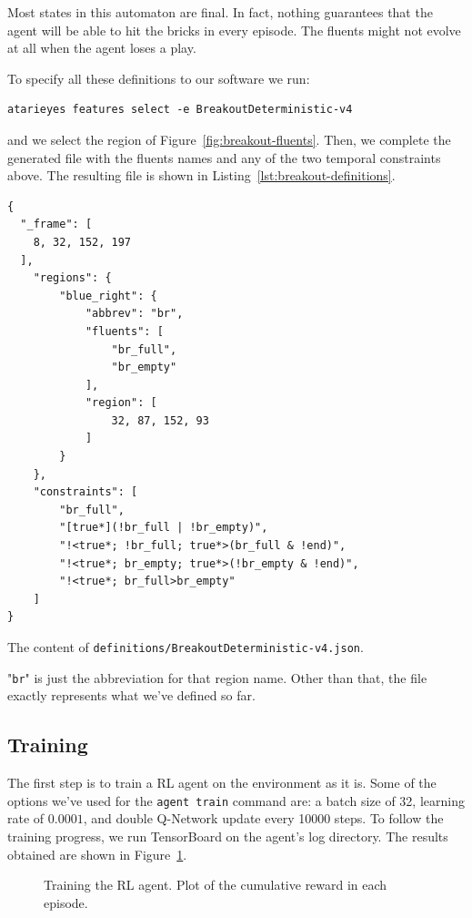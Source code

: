 Most states in this automaton are final. In fact, nothing guarantees that the
agent will be able to hit the bricks in every episode. The fluents might not
evolve at all when the agent loses a play.

To specify all these definitions to our software we run:
\begin{verbatim}
atarieyes features select -e BreakoutDeterministic-v4
\end{verbatim}
and we select the region of Figure~\ref{fig:breakout-fluents}. Then, we
complete the generated file with the fluents names and any of the two temporal
constraints above. The resulting file is shown in
Listing~\ref{lst:breakout-definitions}. 
\begin{listing}
\begin{verbatim}
{
  "_frame": [
    8, 32, 152, 197
  ],
	"regions": {
		"blue_right": {
			"abbrev": "br",
			"fluents": [
				"br_full",
				"br_empty"
			],
			"region": [
				32, 87, 152, 93
			]
		}
	},
	"constraints": [
		"br_full",
		"[true*](!br_full | !br_empty)",
		"!<true*; !br_full; true*>(br_full & !end)",
		"!<true*; br_empty; true*>(!br_empty & !end)",
		"!<true*; br_full>br_empty"
	]
}
\end{verbatim}
\caption{The content of \texttt{definitions/BreakoutDeterministic-v4.json}.}
\label{lst:breakout-definitions}
\end{listing}
"\texttt{br}" is just the abbreviation for that region name. Other than that,
the file exactly represents what we've defined so far.


\subsection{Training}

The first step is to train a RL agent on the environment as it is.
Some of the options we've used for the \verb|agent train| command are: a batch
size of 32, learning rate of $0.0001$, and double Q-Network update every 10000
steps. To follow the training progress, we run TensorBoard on the agent's log
directory.  The results obtained are shown in
Figure~\ref{fig:breakout-agent-train}.
\begin{figure}
	\centering
	\caption{Training the RL agent. Plot of the cumulative reward in each
	episode.}
	\label{fig:breakout-agent-train}
\end{figure}


